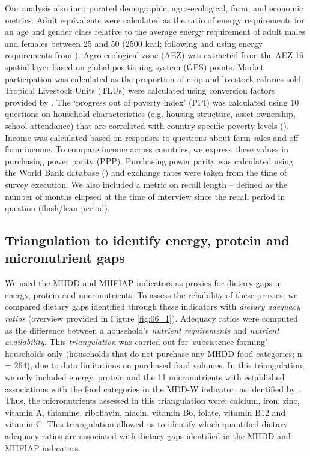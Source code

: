 Our analysis also incorporated demographic, agro-ecological, farm, and economic metrics. Adult equivalents were calculated as the ratio of energy requirements for an age and gender class relative to the average energy requirement of adult males and females between 25 and 50 (2500 kcal; following \citealp{ClaroRafael2010} and using energy requirements from \citealp{FoodandAgricuturalOrganization2001}). Agro-ecological zone (AEZ) was extracted from the \citet{Choice2015} AEZ-16 spatial layer based on global-positioning system (GPS) points. Market participation was calculated as the proportion of crop and livestock calories sold. Tropical Livestock Units (TLUs) were calculated using conversion factors provided by \citet{Njuki2011a}. The `progress out of poverty index' (PPI) was calculated using 10 questions on household characteristics (e.g. housing structure, asset ownership, school attendance) that are correlated with country specific poverty levels (\citealp{Hammond2017225}). Income was calculated based on responses to questions about farm sales and off-farm income. To compare income across countries, we express these values in purchasing power parity (PPP). Purchasing power parity was calculated using the World Bank database (\citealp{WorldBank2018}) and exchange rates were taken from the time of survey execution. We also included a metric on recall length -- defined as the number of months elapsed at the time of interview since the recall period in question (flush/lean period).

\subsection{Triangulation to identify energy, protein and micronutrient gaps}

We used the MHDD and MHFIAP indicators as proxies for dietary gaps in energy, protein and micronutrients. To assess the reliability of these proxies, we compared dietary gaps identified through these indicators with \textit{dietary adequacy ratios} (overview provided in Figure \ref{fig:06_1}). Adequacy ratios were computed as the difference between a household's \textit{nutrient requirements} and \textit{nutrient availability}. This \textit{triangulation} was carried out for `subsistence farming' households only (households that do not purchase any MHDD food categories; n = 264), due to data limitations on purchased food volumes. In this triangulation, we only included energy, protein and the 11 micronutrients with established associations with the food categories in the MDD-W indicator, as identified by \citet{Martin-Prevel2015}. Thus, the micronutrients assessed in this triangulation were: calcium, iron, zinc, vitamin A, thiamine, riboflavin, niacin, vitamin B6, folate, vitamin B12 and vitamin C. This triangulation allowed us to identify which quantified dietary adequacy ratios are associated with dietary gaps identified in the MHDD and MHFIAP indicators.

